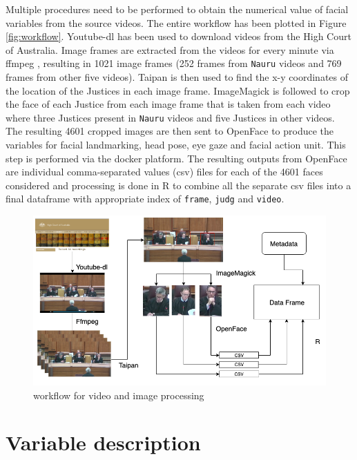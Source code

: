 \documentclass{monashthesis}
\begin{document}
Multiple procedures need to be performed to obtain the numerical value of facial variables from the source videos. The entire workflow has been plotted in Figure \ref{fig:workflow}. Youtube-dl \autocite{youtube-dl} has been used to download videos from the High Court of Australia\autocite{highcourtau}. Image frames are extracted from the videos for every minute via ffmpeg \autocite{ffmpeg}, resulting in 1021 image frames (252 frames from \texttt{Nauru} videos and 769 frames from other five videos). Taipan \autocite{Taipan} is then used to find the x-y coordinates of the location of the Justices in each image frame. ImageMagick \autocite{ImageMagick} is followed to crop the face of each Justice from each image frame that is taken from each video where three Justices present in \texttt{Nauru} videos and five Justices in other videos. The resulting 4601 cropped images are then sent to OpenFace \autocite{baltrusaitis2018openface} to produce the variables for facial landmarking, head pose, eye gaze and facial action unit. This step is performed via the docker platform. The resulting outputs from OpenFace are individual comma-separated values (csv) files for each of the 4601 faces considered and processing is done in R to combine all the separate csv files into a final dataframe with appropriate index of \texttt{frame}, \texttt{judg} and \texttt{video}.

\begin{figure}
\includegraphics[width=1\linewidth]{figures/workflow} \caption{workflow for video and image processing \label{fig:workflow}}\label{fig:unnamed-chunk-1}
\end{figure}

\hypertarget{variable-description}{%
\section{Variable description}\label{variable-description}}
\end{document}
